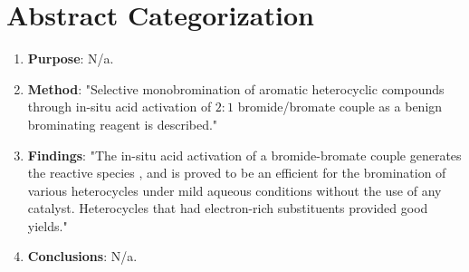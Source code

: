 \documentclass{article}
\begin{document}
\pagestyle{main}
\renewcommand{\leftmark}{Written Assignment 4}
\section*{Abstract Categorization}
\begin{enumerate}
    \item \textbf{Purpose}: N/a.
    \item \textbf{Method}: "Selective monobromination of aromatic heterocyclic compounds through in-situ acid activation of $2:1$ bromide/bromate couple as a benign brominating reagent is described."
    \item \textbf{Findings}: "The in-situ acid activation of a bromide-bromate couple generates the reactive species , and is proved to be an efficient for the bromination of various heterocycles under mild aqueous conditions without the use of any catalyst. Heterocycles that had electron-rich substituents provided good yields."
    \item \textbf{Conclusions}: N/a.
\end{enumerate}
\end{document}
